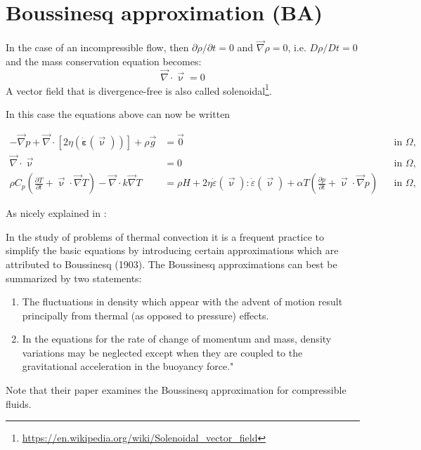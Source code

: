 \documentclass[a4paper,12pt]{article}
\begin{document}
\newpage
\section{Boussinesq approximation (BA)}

In the case of an incompressible flow, then $\partial \rho/\partial t=0$ and
${\vec \nabla}\rho=0$, i.e. $D\rho/Dt=0$ and the mass conservation equation becomes:
\[
{\vec \nabla}\cdot{\vec \upnu} = 0
\]
A vector field that is divergence-free is also called
solenoidal\footnote{\url{https://en.wikipedia.org/wiki/Solenoidal_vector_field}}.

In this case the equations above can now be written

\begin{align}
  - \vec\nabla p +  
  \vec\nabla \cdot \left[2\eta \left(\dot{\bm \varepsilon}(\vec \upnu)  \right)
                \right] +  \rho \vec g &= \vec{0}
  &
  & \textrm{in $\Omega$},
  \\
  \vec\nabla \cdot \vec \upnu &= 0
  &
  & \textrm{in $\Omega$},
  \\
  \rho C_p \left(\frac{\partial T}{\partial t} + \vec \upnu\cdot\vec\nabla T\right)
  - \vec\nabla\cdot k\vec\nabla T
  &=
  \rho H
  +
  2\eta \dot\varepsilon(\vec\upnu) : \dot\varepsilon(\vec\upnu) 
  +\alpha T \left( \frac{\partial p}{\partial t} +  \vec \upnu \cdot \vec\nabla p \right)
  && \textrm{in $\Omega$},
\end{align}

\noindent As nicely explained in \textcite{spve60}: 
\begin{displayquote}
{\color{darkgray}
In the study of problems of thermal convection it is a frequent practice to simplify the basic 
equations by introducing certain approximations which are attributed to
Boussinesq (1903). The Boussinesq approximations can best be summarized by two
statements: 
\begin{enumerate}
\item The fluctuations in density which appear with the advent of motion
result principally from thermal (as opposed to pressure) effects. 
\item In the equations
for the rate of change of momentum and mass, density variations may be neglected except
when they are coupled to the gravitational acceleration in the buoyancy force."
\end{enumerate}
}
\end{displayquote}
Note that their paper examines the Boussinesq approximation for compressible fluids.  
\end{document}
